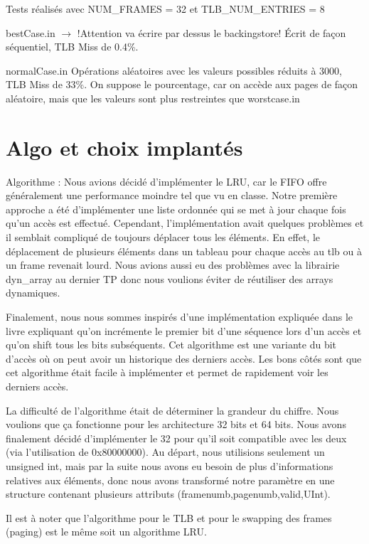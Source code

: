 \documentclass{article}
\begin{document}
Tests réalisés avec NUM\_FRAMES = 32 et   TLB\_NUM\_ENTRIES = 8

bestCase.in $\rightarrow $ !Attention va écrire par dessus le backingstore!
Écrit de façon séquentiel, TLB Miss de 0.4\%.

normalCase.in
Opérations aléatoires avec les valeurs possibles réduits à 3000, TLB Miss de 33\%. On suppose le pourcentage, car on accède aux pages de façon aléatoire, mais que les valeurs sont plus restreintes que worstcase.in

\section{Algo et choix implantés}
\par
Algorithme : Nous avions décidé d’implémenter le LRU, car le FIFO offre généralement une performance moindre tel que vu en classe. Notre première approche a été d’implémenter une liste ordonnée qui se met à jour chaque fois qu’un accès est effectué. Cependant, l’implémentation avait quelques problèmes et il semblait compliqué de toujours déplacer tous les éléments. En effet, le déplacement de plusieurs éléments dans un tableau pour chaque accès au tlb ou à un frame revenait lourd. Nous avions aussi eu des problèmes avec la librairie dyn\_array au dernier TP donc nous voulions éviter de réutiliser des arrays dynamiques. 

Finalement, nous nous sommes inspirés d’une implémentation expliquée dans le livre expliquant qu’on incrémente le premier bit d’une séquence lors d’un accès et qu’on shift tous les bits subséquents. Cet algorithme est une variante du bit d’accès où on peut avoir un historique des derniers accès. Les bons côtés sont que cet algorithme était facile à implémenter et permet de rapidement voir les derniers accès. 

La difficulté de l’algorithme était de déterminer la grandeur du chiffre. Nous voulions que ça fonctionne pour les architecture 32 bits et 64 bits. Nous avons finalement décidé d’implémenter le 32 pour qu’il soit compatible avec les deux (via l’utilisation de 0x80000000). Au départ, nous utilisions seulement un unsigned int, mais par la suite nous avons eu besoin de plus d’informations relatives aux éléments, donc nous avons transformé notre paramètre en une structure contenant plusieurs attributs (framenumb,pagenumb,valid,UInt).

Il est à noter que l’algorithme pour le TLB et pour le swapping des frames (paging) est le même  soit un algorithme  LRU.
\end{document}
